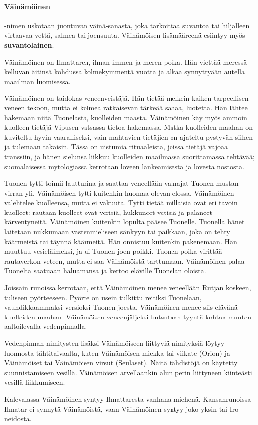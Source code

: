   \paragraph{Väinämöinen}-nimen uskotaan juontuvan väinä-sanasta, joka tarkoittaa suvantoa tai
    hiljalleen virtaavaa vettä, salmea tai joensuuta. Väinämöisen lisämääreenä esiintyy myös
    \textbf{suvantolainen}. \par
    Väinämöinen on Ilmattaren, ilman immen ja meren poika. Hän viettää meressä kelluvan äitinsä
    kohdussa kolmekymmentä vuotta ja alkaa synnyttyään autella maailman luomisessa. \par
    Väinämöinen on taidokas veneenveistäjä. Hän tietää melkein kaiken tarpeellisen veneen tekoon,
    mutta ei kolmea ratkaisevan tärkeää sanaa, luotetta. Hän lähtee hakemaan niitä Tuonelasta,
    kuolleiden maasta. Väinämöinen käy myös ammoin kuolleen tietäjä Vipusen vatsassa tietoa
    hakemassa. Matka kuolleiden maahan on kuviteltu hyvin vaaralliseksi, vain mahtavien
    tietäjien on ajateltu pystyvän siihen ja tulemaan takaisin. Tässä on uistumia rituaaleista,
    joissa tietäjä vajoaa transsiin, ja hänen sielunsa liikkuu kuolleiden maailmassa suorittamassa
    tehtävää; suomalaisessa mytologiassa kerrotaan loveen lankeamisesta ja lovesta nostosta. \par
    Tuonen tytti toimii lautturina ja saattaa veneellään vainajat Tuonen mustan virran yli.
    Väinämöisen tytti kuitenkin huomaa olevan elossa. Väinämöinen valehtelee kuolleensa, mutta ei
    vakuuta. Tytti tietää millaisia ovat eri tavoin kuolleet: rautaan kuolleet ovat verisiä,
    hukkuneet vetisiä ja palaneet kärventyneitä. Väinämöinen kuitenkin lopulta pääsee Tuonelle.
    Tuonella hänet laitetaan nukkumaan vastenmieliseen sänkyyn tai paikkaan, joka on tehty
    käärmeistä tai täynnä käärmeitä. Hän onnistuu kuitenkin pakenemaan. Hän muuttuu vesieläimeksi,
    ja ui Tuonen joen poikki. Tuonen poika virittää rautaverkon veteen, mutta ei saa Väinämöistä
    tarttumaan. Väinämöinen palaa Tuonelta saatuaan haluamansa ja kertoo eläville Tuonelan
    oloista. \par
    Joissain runoissa kerrotaan, että Väinämöinen menee veneellään Rutjan koskeen, tuliseen
    pyörteeseen. Pyörre on usein tulkittu reitiksi Tuonelaan, vauhdikkaammaksi versioksi Tuonen
    joesta. Väinämöinen menee siis elävänä kuolleiden maahan. Väinämöisen veneenjäljeksi kutsutaan
    tyyntä kohtaa muuten aaltoilevalla vedenpinnalla. \par
    Vedenpinnan nimitysten lisäksi Väinämöiseen liittyviä nimityksiä löytyy luonnosta
    tähtitaivaalta, kuten Väinämöisen miekka tai viikate (Orion) ja Väinämöiset tai Väinämöisen
    virsut (Seulaset). Näitä tähdistöjä on käytetty suunnistamiseen vesillä. Väinämöisen
    arvellaankin alun perin liittyneen kiinteästi vesillä liikkumiseen. \par
    Kalevalassa Väinämöinen syntyy Ilmattaresta vanhana miehenä. Kansanrunoissa Ilmatar ei synnytä
    Väinämöistä, vaan Väinämöinen syntyy joko yksin tai Iro-neidosta.


